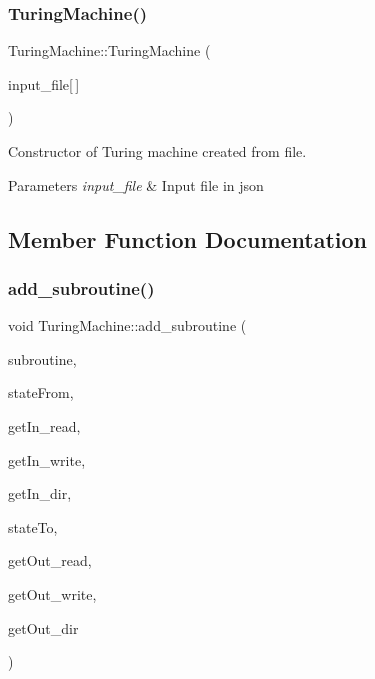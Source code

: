 \subsubsection{\texorpdfstring{Turing\+Machine()}{TuringMachine()}\hspace{0.1cm}{\footnotesize\ttfamily [2/2]}}
{\footnotesize\ttfamily Turing\+Machine\+::\+Turing\+Machine (\begin{DoxyParamCaption}\item[{char}]{input\+\_\+file\mbox{[}$\,$\mbox{]} }\end{DoxyParamCaption})\hspace{0.3cm}{\ttfamily [explicit]}}



Constructor of Turing machine created from file. 


\begin{DoxyParams}{Parameters}
{\em input\+\_\+file} & Input file in json \\
\hline
\end{DoxyParams}


\subsection{Member Function Documentation}
\mbox{\label{classTuringMachine_a15485e4e3a38f21581f0d13127b6e6f7}} 
\subsubsection{\texorpdfstring{add\+\_\+subroutine()}{add\_subroutine()}}
{\footnotesize\ttfamily void Turing\+Machine\+::add\+\_\+subroutine (\begin{DoxyParamCaption}\item[{\hyperlink{classTuringMachine}{Turing\+Machine} \&\&}]{subroutine,  }\item[{\hyperlink{classState}{State} $\ast$}]{state\+From,  }\item[{std\+::vector$<$ \hyperlink{classTapeSymbol}{Tape\+Symbol} $\ast$$>$ \&\&}]{get\+In\+\_\+read,  }\item[{std\+::vector$<$ \hyperlink{classTapeSymbol}{Tape\+Symbol} $\ast$$>$ \&\&}]{get\+In\+\_\+write,  }\item[{std\+::vector$<$ Direction $>$ \&\&}]{get\+In\+\_\+dir,  }\item[{\hyperlink{classState}{State} $\ast$}]{state\+To,  }\item[{std\+::vector$<$ \hyperlink{classTapeSymbol}{Tape\+Symbol} $\ast$$>$ \&\&}]{get\+Out\+\_\+read,  }\item[{std\+::vector$<$ \hyperlink{classTapeSymbol}{Tape\+Symbol} $\ast$$>$ \&\&}]{get\+Out\+\_\+write,  }\item[{std\+::vector$<$ Direction $>$ \&\&}]{get\+Out\+\_\+dir }\end{DoxyParamCaption})}



